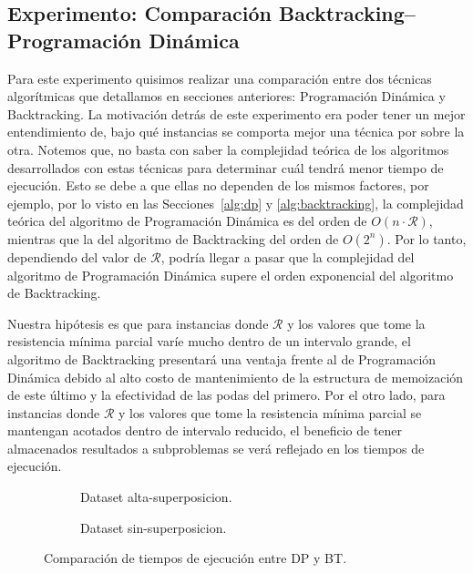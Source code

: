 \documentclass{article}
\newcommand{\Res}{\mathcal{R}}
\begin{document}
\subsection{Experimento: Comparación Backtracking--Programación Dinámica}
Para este experimento quisimos realizar una comparación entre dos técnicas algorítmicas que detallamos en secciones anteriores: Programación Dinámica y Backtracking. La motivación detrás de este experimento era poder tener un mejor entendimiento de, bajo qué instancias se comporta mejor una técnica por sobre la otra. Notemos que, no basta con saber la complejidad teórica de los algoritmos desarrollados con estas técnicas para determinar cuál tendrá menor tiempo de ejecución. Esto se debe a que ellas no dependen de los mismos factores, por ejemplo, por lo visto en las Secciones~\ref{alg:dp} y \ref{alg:backtracking}, la complejidad teórica del algoritmo de Programación Dinámica es del orden de $O(n \cdot \Res)$, mientras que la del algoritmo de Backtracking del orden de $O(2^{n})$. Por lo tanto, dependiendo del valor de $\Res$, podría llegar a pasar que la complejidad del algoritmo de Programación Dinámica supere el orden exponencial del algoritmo de Backtracking.

Nuestra hipótesis es que para instancias donde $\Res$ y los valores que tome la resistencia mínima parcial varíe mucho dentro de un intervalo grande, el algoritmo de Backtracking presentará una ventaja frente al de Programación Dinámica debido al alto costo de mantenimiento de la estructura de memoización de este último y la efectividad de las podas del primero. Por el otro lado, para instancias donde $\Res$ y los valores que tome la resistencia mínima parcial se mantengan acotados dentro de intervalo reducido, el beneficio de tener almacenados resultados a subproblemas se verá reflejado en los tiempos de ejecución.

\begin{figure}[!ht]
    \centering
    \begin{subfigure}[b]{0.45\textwidth}
        \centering
        
        \caption{Dataset alta-superposicion.}
        \label{fig:comparacion-bt-dp-alta}
    \end{subfigure}
    \begin{subfigure}[b]{0.45\textwidth}
        \centering
        
        \caption{Dataset sin-superposicion.}
        \label{fig:comparacion-bt-dp-baja}
    \end{subfigure}
    \caption{Comparación de tiempos de ejecución entre DP y BT.}
    \label{fig:comparacion-bt-dp}
\end{figure}
\end{document}
